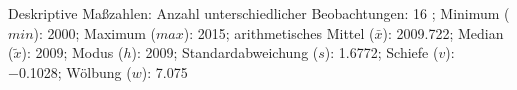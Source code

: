 				\label{tableValues:mres022b}
				\vspace*{-\baselineskip}
                    \begin{noten}
                	    \note{} Deskriptive Maßzahlen:
                	    Anzahl unterschiedlicher Beobachtungen: 16%
                	    ; 
                	      Minimum ($min$): 2000; 
                	      Maximum ($max$): 2015; 
                	      arithmetisches Mittel ($\bar{x}$): \num[round-mode=places,round-precision=2]{2009.722}; 
                	      Median ($\tilde{x}$): 2009; 
                	      Modus ($h$): 2009; 
                	      Standardabweichung ($s$): \num[round-mode=places,round-precision=2]{1.6772}; 
                	      Schiefe ($v$): \num[round-mode=places,round-precision=2]{-0.1028}; 
                	      Wölbung ($w$): \num[round-mode=places,round-precision=2]{7.075}
                     \end{noten}

